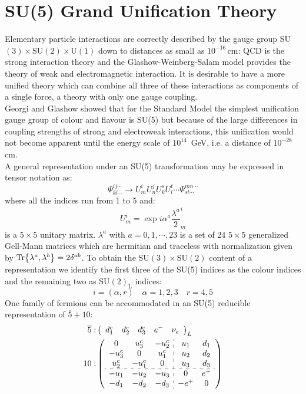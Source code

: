 \documentclass[../main.tex]{subfiles}
\begin{document}
\section{SU(5) Grand Unification Theory}
Elementary particle interactions are correctly described by the gauge group SU$(3)\times$SU$(2)\times$U$(1)$ down to distances as small as $10^{-16}$\,cm: QCD is the strong interaction theory and the Glashow-Weinberg-Salam model provides the theory of weak and electromagnetic interaction. It is desirable to have a more unified theory which can combine all three of these interactions as components of a single force, a theory with only one gauge coupling.\\
Georgi and Glashow showed that for the Standard Model the simplest unification gauge group of colour and flavour is SU(5) but because of the large differences in coupling strengths of strong and electroweak interactions, this unification would not become apparent until the energy scale of $10^{14}$ \,GeV, i.e. a distance of $10^{-28}$\,cm.\\
A general representation under an SU(5) transformation may be expressed in tensor notation as:
\[
\Psi^{ij\cdots}_{kl\cdots}\to U^i_mU^j_nU^s_kU^t_l\cdots\Psi^{mn\cdots}_{st\cdots}
\]
where all the indices run from 1 to 5 and:
\[
U^i_m=\exp{i\alpha^a\frac{\lambda^a}{2}}^i_m
\]
is a $5\times5$ unitary matrix. $\lambda^a$ with $a=0,1,\cdots,23$ is a set of 24 $5\times5$ generalized Gell-Mann matrices which are hermitian and traceless with normalization given by $\Tr{\lambda^a,\lambda^b}=2\delta^{ab}$. To obtain the SU$(3)\times$SU$(2)$ content of a representation we identify the first three of the SU(5) indices as the colour indices and the remaining two as SU$(2)_{\text{L}}$ indices:
\[
i=(\alpha,r) \quad \alpha=1,2,3 \quad r=4,5
\]
One family of fermions can be accommodated in an SU(5) reducible representation of $\overline{5}+10$:
\[
\begin{aligned}
\overline{5}:&\left(\begin{array}{ccccc}
d_1^c&d_2^c&d_3^c&e^-&\nu_e
\end{array}\right)_L\\
10: &\left(\begin{array}{ccc:cc}
0 & u_3^c & -u_2^c & u_1 & d_1\\
-u_3^c & 0 & u_1^c & u_2 & d_2\\
u_2^c & -u_1^c & 0 & u_3 & d_3\\
\hdashline
-u_1 & -u_2 & -u_3 & 0 & e^+\\
-d_1 & -d_2 & -d_3 & -e^+ & 0
\end{array}\right)
\end{aligned}
\]
\end{document}
